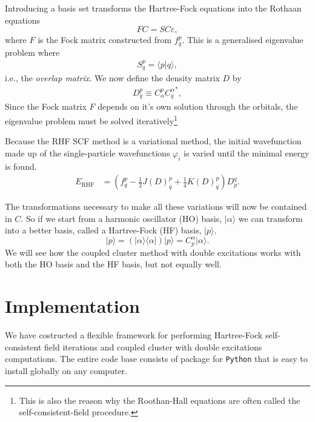 \documentclass[
    a4paper, aps, twocolumn, floatfix, superscriptaddress,
    nofootinbib]{revtex4-1}
\newcommand{\1}{\mathds{1}}
\newcommand{\para}[1]{\left(#1\right)}
\newcommand{\half}{\frac{1}{2}}
\newcommand{\bra}[1]{\langle #1\lvert}
\newcommand{\ket}[1]{\rvert #1\rangle}
\newcommand{\braket}[2]{\langle #1 \vert #2 \rangle}
\begin{document}
            Introducing a basis set transforms the Hartree-Fock equations into
            the Rothaan equations
            \begin{equation}
                FC = SC\varepsilon,
            \end{equation}
            where $F$ is the Fock matrix constructed from $f^p_q$.  This is a
            generalised eigenvalue problem where
            \begin{align}
                S^{p}_{q} = \braket{p}{q},
            \end{align}
            i.e., the \emph{overlap matrix}. We now define the density matrix
            $D$ by
            \begin{align}
                D^{p}_{q} \equiv C^p_{\alpha}{C^{\alpha}_q}^{*},
            \end{align}
            Since the Fock matrix $F$ depends on it's own solution through the
            orbitals, the eigenvalue problem must be solved
            iteratively\footnote{This is also the reason why the Roothan-Hall
            equations are often called the self-consistent-field procedure.}

            Because the RHF SCF method is a variational method, the initial
            wavefunction made up of the single-particle wavefunctions
            $\varphi_i$ is varied until the minimal energy is found.
            \begin{align}
                E_{\text{RHF}}
                &= \para{
                    f^p_q - \half J(D)^p_q + \frac{1}{4}K(D)^p_q
                }D^q_p.
            \end{align}

            The transformations necessary to make all these variations will now
            be contained in $C$. So if we start from a harmonic oscillator (HO)
            basis, $\ket{\alpha}$ we can transform into a better basis, called a
            Hartree-Fock (HF) basis, $\ket{p}$.
            \begin{equation}
                \ket{p}
                = \para{\ket{\alpha}\bra{\alpha}}\ket{p}
                = C^{\alpha}_p\ket{\alpha}.
            \end{equation}
            We will see how the coupled cluster method with double excitations
            works with both the HO basis and the HF basis, but not equally well.

\section{Implementation}
    We have costructed a flexible framework for performing Hartree-Fock
    self-consistent field iterations and coupled cluster with double excitations
    computations. The entire code base consists of package for
    \lstinline{Python} that is easy to install globally on any computer.
\end{document}
